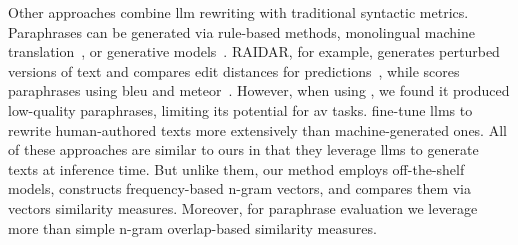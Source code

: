 Other approaches combine \ac{llm} rewriting with traditional syntactic metrics. 
Paraphrases can be generated via rule-based methods, monolingual machine translation~\citep{zhou_paraphrase_2021}, or generative models~\citep{kurt_pehlivanoglu_comparative_2024}. 
RAIDAR, for example, generates perturbed versions of text and compares edit distances for predictions~\citep{mao_raidar_2024}, while \mirrorMinds{} scores paraphrases using \acs{bleu} and \acs{meteor}~\citep{baradia_mirror_2025}. 
However, when using \mirrorMinds{}, we found it produced low-quality paraphrases, limiting its potential for \ac{av} tasks. %
\citet{li_learning_2025} fine-tune \acp{llm} to rewrite human-authored texts more extensively than machine-generated ones. 
All of these approaches are similar to ours in that they leverage \acp{llm} to generate texts at inference time. 
But unlike them, our method employs off-the-shelf models, constructs frequency-based n-gram vectors, and compares them via vectors similarity measures.
Moreover, for paraphrase evaluation we leverage more than simple n-gram overlap-based similarity measures.
